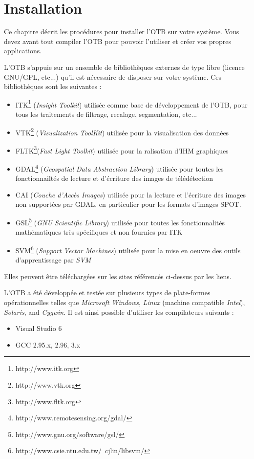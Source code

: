 \chapter{Installation}
\label{chapter:Installation}


Ce chapitre d\'{e}crit les proc\'{e}dures pour installer l'OTB sur votre syst\`{e}me.
Vous devez avant tout compiler l'OTB pour pouvoir l'utiliser et cr\'{e}er vos propres applications.


L'OTB s'appuie sur un ensemble de biblioth\`{e}ques externes de type libre (licence GNU/GPL, etc...) qu'il est n\'{e}cessaire de disposer sur votre syst\`{e}me.
Ces biblioth\`{e}ques sont les suivantes :
\begin{itemize}
\item ITK\footnote{http://www.itk.org} (\emph{Insight Toolkit}) utilis\'{e}e comme base de d\'{e}veloppement de l'OTB, pour tous les traitements de filtrage, recalage, segmentation, etc...
\item VTK\footnote{http://www.vtk.org} (\emph{Visualization ToolKit}) utilis\'{e}e pour la visualisation des donn\'{e}es
\item FLTK\footnote{http://www.fltk.org}(\emph{Fast Light Toolkit}) utilis\'{e}e pour la ralisation d'IHM graphiques
\item GDAL\footnote{http://www.remotesensing.org/gdal/} (\emph{Geospatial Data Abstraction Library}) utilis\'{e}e pour toutes les fonctionnailt\'{e}s de lecture et d'\'{e}criture des images de t\'{e}l\'{e}d\'{e}tection
\item CAI (\emph{Couche d'Acc\`{e}s Images}) utilis\'{e}e pour la lecture et l'\'{e}criture des images non support\'{e}es par GDAL, en particulier pour les formats d'images SPOT.
\item GSL\footnote{http://www.gnu.org/software/gsl/} (\emph{GNU Scientific Library}) utilis\'{e}e pour toutes les fonctionnalit\'{e}s math\'{e}matiques 
tr\`{e}s sp\'{e}cifiques et non fournies par ITK
\item SVM\footnote{http://www.csie.ntu.edu.tw/~cjlin/libsvm/} (\emph{Support Vector Machines}) utilis\'{e}e pour la mise en oeuvre des outils d'apprentissage par \emph{SVM}
\end{itemize}

Elles peuvent \^{e}tre t\'{e}l\'{e}charg\'{e}es sur les sites r\'{e}f\'{e}renc\'{e}s ci-dessus par les liens.



L'OTB a \'{e}t\'{e} d\'{e}velopp\'{e}e et test\'{e}e sur plusieurs types de plate-formes op\'{e}rationnelles telles que \emph{Microsoft Windows}, 
\emph{Linux} (machine compatible \emph{Intel}), \emph{Solaris}, and \emph{Cygwin}.
Il est ainsi possible d'utiliser les compilateurs suivants :
\begin{itemize}
\item Visual Studio 6
\item GCC 2.95.x, 2.96, 3.x
\end{itemize}

